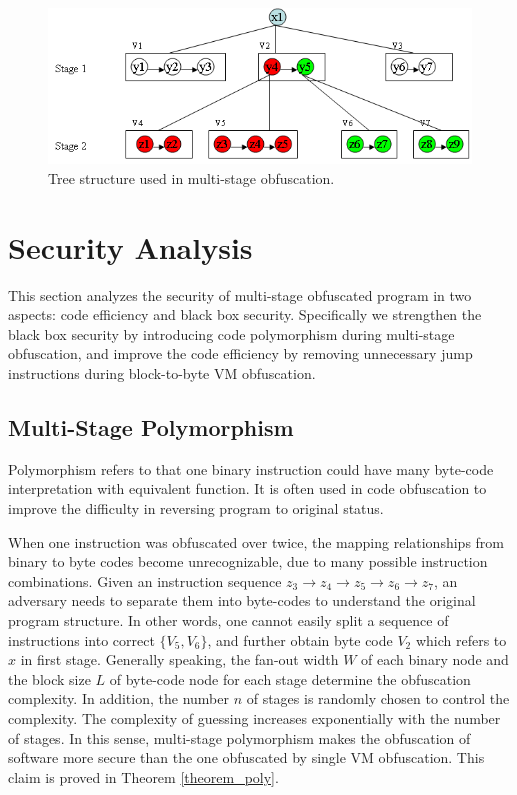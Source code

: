 \documentclass{../style/llncs}                   %
\begin{document}
\begin{figure}  \centering
\includegraphics[width=0.7\columnwidth]{./figure/fig_obf_polymor}
\caption{Tree structure used in multi-stage obfuscation.}
\label{fig_obf_polymor}
\end{figure}








\section{Security Analysis} \label{section_analysis}


This section analyzes the security of multi-stage obfuscated program
in two aspects: code efficiency and black box security.
Specifically we strengthen the black box security by introducing
code polymorphism during multi-stage obfuscation,
and improve the code efficiency by removing unnecessary jump
instructions during block-to-byte VM obfuscation.

\subsection{Multi-Stage Polymorphism}

Polymorphism refers to that one binary instruction could have many byte-code
interpretation with equivalent function. It is often used in code obfuscation
to improve the difficulty in reversing program to original status.

When one instruction was obfuscated over twice,
the mapping relationships from binary to byte codes become unrecognizable,
due to many possible instruction combinations.
Given an instruction sequence $z_3 \rightarrow z_4 \rightarrow z_5 \rightarrow z_6 \rightarrow z_7$,
an adversary needs to separate them into byte-codes to understand the original program structure.
In other words, one cannot easily
split a sequence of instructions into correct $\{V_5, V_6\}$,
and further obtain byte code $V_2$ which refers to $x$ in first stage.
Generally speaking, the fan-out width $W$ of each binary node and the block size $L$ of byte-code
node for each stage
determine the obfuscation complexity.
In addition, the number $n$ of stages is randomly chosen to control the complexity.
The complexity of guessing increases exponentially with the number of stages.
In this sense, multi-stage polymorphism makes the obfuscation of software more secure
than the one obfuscated by single VM obfuscation.
This claim is proved in Theorem \ref{theorem_poly}.
\end{document}
